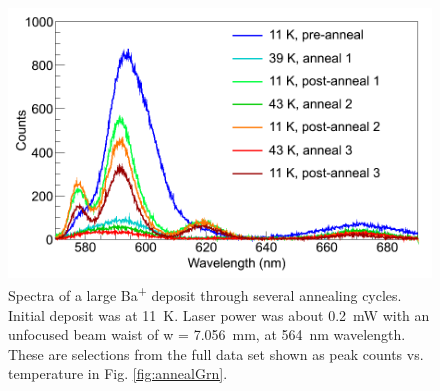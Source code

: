 

\begin{figure} %
        \centering
                \includegraphics[width=.7\textwidth]{figures/spectra_annealing.png}
                \caption{Spectra of a large Ba\textsuperscript{+} deposit through several annealing cycles.  Initial deposit was at 11~K.  Laser power was about 0.2~mW with an unfocused beam waist of w = 7.056~mm, at 564~nm wavelength.  These are selections from the full data set shown as peak counts vs. temperature in Fig. \ref{fig:annealGrn}.  \cite{Mong2015}}
\label{fig:specAnneal}
\end{figure}

